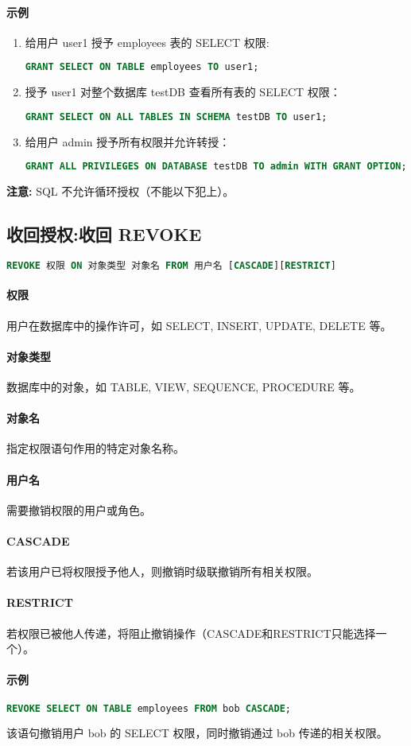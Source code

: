 \paragraph*{示例}
\begin{enumerate}
    \item 给用户 user1 授予 employees 表的 SELECT 权限:
    \begin{lstlisting}[language=SQL]
        GRANT SELECT ON TABLE employees TO user1;
    \end{lstlisting}
    \item 授予 user1 对整个数据库 testDB 查看所有表的 SELECT 权限：
    \begin{lstlisting}[language=SQL]
        GRANT SELECT ON ALL TABLES IN SCHEMA testDB TO user1;
    \end{lstlisting}
    \item 给用户 admin 授予所有权限并允许转授：
    \begin{lstlisting}[language=SQL]
        GRANT ALL PRIVILEGES ON DATABASE testDB TO admin WITH GRANT OPTION;
    \end{lstlisting}
\end{enumerate}
\textbf{注意:} SQL 不允许循环授权（不能以下犯上）。

\subsection{收回授权:收回 REVOKE}
\begin{lstlisting}[language=SQL]
    REVOKE 权限 ON 对象类型 对象名 FROM 用户名 [CASCADE][RESTRICT]
\end{lstlisting}
\paragraph*{权限} 用户在数据库中的操作许可，如 SELECT, INSERT, UPDATE, DELETE 等。
\paragraph*{对象类型} 数据库中的对象，如 TABLE, VIEW, SEQUENCE, PROCEDURE 等。
\paragraph*{对象名} 指定权限语句作用的特定对象名称。
\paragraph*{用户名} 需要撤销权限的用户或角色。
\paragraph*{CASCADE} 若该用户已将权限授予他人，则撤销时级联撤销所有相关权限。
\paragraph*{RESTRICT} 若权限已被他人传递，将阻止撤销操作（CASCADE和RESTRICT只能选择一个）。
\paragraph*{示例}
\begin{lstlisting}[language=SQL]
REVOKE SELECT ON TABLE employees FROM bob CASCADE;
\end{lstlisting}
该语句撤销用户 bob 的 SELECT 权限，同时撤销通过 bob 传递的相关权限。






